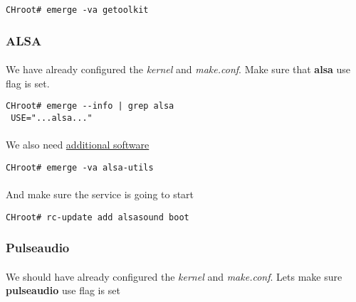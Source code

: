 \documentclass[10pt,a4paper]{article}
\begin{document}
                    \begin{lstlisting}[style=BashInputCHRoot]
 CHroot# emerge -va getoolkit
                    \end{lstlisting}

                \newpage
                \subsubsection{ALSA}

                    \paragraph{} We have already configured the \textit{kernel} and \textit{make.conf}. Make sure that \textbf{alsa} use flag is set.

                    \begin{lstlisting}[style=BashInputCHRoot]
 CHroot# emerge --info | grep alsa
 USE="...alsa..."
                    \end{lstlisting}

                    \paragraph{} We also need \href{https://wiki.gentoo.org/wiki/ALSA#Software}{additional software}

                    \begin{lstlisting}[style=BashInputCHRoot]
 CHroot# emerge -va alsa-utils
                    \end{lstlisting}

                    \paragraph{} And make sure the service is going to start

                    \begin{lstlisting}[style=BashInputCHRoot]
 CHroot# rc-update add alsasound boot
                    \end{lstlisting}

                \newpage
                \subsubsection{Pulseaudio}

                    \paragraph{} We should have already configured the \textit{kernel} and \textit{make.conf}. Lets make sure \textbf{pulseaudio} use flag is set
\end{document}
